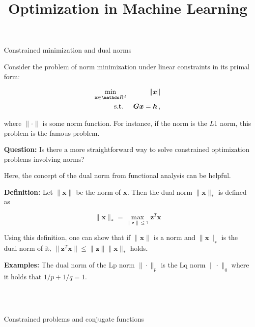 \documentclass[11pt,compress,t,notes=noshow, xcolor=table]{beamer}
\title{Optimization in Machine Learning}
\date{}
\begin{document}
\sloppy
\begin{vbframe}{Constrained minimization and dual norms}

Consider the problem of norm minimization under linear constraints
in its primal form:

\begin{eqnarray*}
 \min_{\xv \in \R^d} && \| \bm{x} \| \\
\text{s.t. } &&  \bm{G} \bm{x} = \bm{h}\,,\\
\end{eqnarray*}

where $\| \cdot \|$ is some norm function. For instance, if the norm is the $L1$ norm, this problem is the famous  \href{https://en.wikipedia.org/wiki/Basis_pursuit
}{} problem.

\lz

\textbf{Question:} Is there a more straightforward way to solve constrained optimization problems involving norms?

\framebreak

Here, the concept of the dual norm from functional analysis can be helpful.


\textbf{Definition:}  Let $\| \bm{x} \|$ be the norm of $\bm{x}$. Then the dual norm $\| \bm{x} \|_*$ is defined as 

\begin{equation*}
 \| \bm{x} \|_* = \max_{\|\bm{z}\| \le 1} \bm{z}^T\bm{x}  
\end{equation*}

Using this definition, one can show 
that if $\| \bm{x} \|$ is a norm and $\| \bm{x} \|_∗$ is the dual norm
of it, $\| \bm{z}^T \bm{x} \| \le \| \bm{z} \| \| \bm{x} \|_*$ holds.

\lz

\textbf{Examples:} The dual norm of the Lp norm $\| \cdot \|_p$ is the
Lq norm $\| \cdot \|_q$ where it holds that $1/p + 1/q = 1$. 


\\\\

\end{vbframe}

\begin{vbframe}{Constrained problems and conjugate functions}



\end{vbframe}










\endlecture
\end{document}
